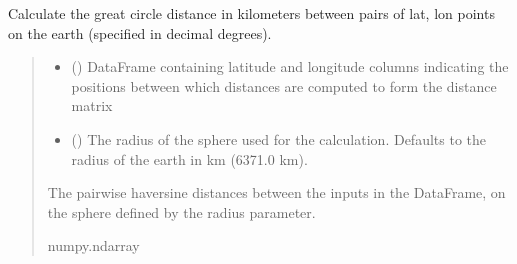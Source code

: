\documentclass[letterpaper,10pt,english]{sphinxmanual}
\begin{document}

\begin{fulllineitems}
\label{\detokenize{misc:glomar_gridding.distances.haversine_distance_from_frame}}
\pysigstartsignatures
\pysiglinewithargsret
{}
{\sphinxparamcomma {}}
{}
\pysigstopsignatures
\sphinxAtStartPar
Calculate the great circle distance in kilometers between pairs of lat, lon
points on the earth (specified in decimal degrees).
\begin{quote}\begin{description}
\begin{itemize}
\item {}
\sphinxAtStartPar
{} () \textendash{} DataFrame containing latitude and longitude columns indicating the
positions between which distances are computed to form the distance
matrix

\item {}
\sphinxAtStartPar
{} () \textendash{} The radius of the sphere used for the calculation. Defaults to the
radius of the earth in km (6371.0 km).

\end{itemize}

\sphinxAtStartPar
{} \textendash{} The pairwise haversine distances between the inputs in the DataFrame,
on the sphere defined by the radius parameter.

\sphinxAtStartPar
numpy.ndarray

\end{description}\end{quote}

\end{fulllineitems}

\end{document}
